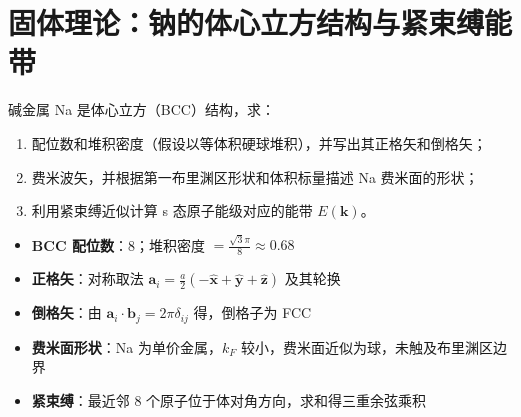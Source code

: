 \section{固体理论：钠的体心立方结构与紧束缚能带}
\label{sec:na-bcc}

\begin{modelbox}
碱金属 Na 是体心立方（BCC）结构，求：
\begin{enumerate}
    \item 配位数和堆积密度（假设以等体积硬球堆积），并写出其正格矢和倒格矢；
    \item 费米波矢，并根据第一布里渊区形状和体积标量描述 Na 费米面的形状；
    \item 利用紧束缚近似计算 s 态原子能级对应的能带 $E(\bm{k})$。
\end{enumerate}
\end{modelbox}

\begin{tipbox}[考点快速分析]
\begin{itemize}
    \item \textbf{BCC 配位数}：8；堆积密度 $=\frac{\sqrt{3}\pi}{8}\approx0.68$
    \item \textbf{正格矢}：对称取法 $\bm{a}_i=\frac{a}{2}(-\hat{\bm{x}}+\hat{\bm{y}}+\hat{\bm{z}})$ 及其轮换
    \item \textbf{倒格矢}：由 $\bm{a}_i\cdot\bm{b}_j=2\pi\delta_{ij}$ 得，倒格子为 FCC
    \item \textbf{费米面形状}：Na 为单价金属，$k_F$ 较小，费米面近似为球，未触及布里渊区边界
    \item \textbf{紧束缚}：最近邻 8 个原子位于体对角方向，求和得三重余弦乘积
\end{itemize}
\end{tipbox}

